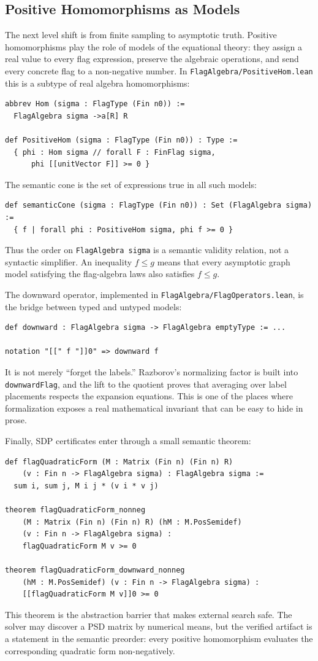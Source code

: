 \documentclass{article}
\newcommand{\lean}[1]{\texttt{#1}}
\begin{document}
\subsection{Positive Homomorphisms as Models}

The next level shift is from finite sampling to asymptotic truth.  Positive
homomorphisms play the role of models of the equational theory: they assign a
real value to every flag expression, preserve the algebraic operations, and
send every concrete flag to a non-negative number.  In
\lean{FlagAlgebra/PositiveHom.lean} this is a subtype of real algebra
homomorphisms:
\begin{lstlisting}
abbrev Hom (sigma : FlagType (Fin n0)) :=
  FlagAlgebra sigma ->a[R] R

def PositiveHom (sigma : FlagType (Fin n0)) : Type :=
  { phi : Hom sigma // forall F : FinFlag sigma,
      phi [[unitVector F]] >= 0 }
\end{lstlisting}
The semantic cone is the set of expressions true in all such models:
\begin{lstlisting}
def semanticCone (sigma : FlagType (Fin n0)) : Set (FlagAlgebra sigma) :=
  { f | forall phi : PositiveHom sigma, phi f >= 0 }
\end{lstlisting}
Thus the order on \lean{FlagAlgebra sigma} is a semantic validity relation, not
a syntactic simplifier.  An inequality $f\leq g$ means that every asymptotic
graph model satisfying the flag-algebra laws also satisfies $f\leq g$.

The downward operator, implemented in \lean{FlagAlgebra/FlagOperators.lean},
is the bridge between typed and untyped models:
\begin{lstlisting}
def downward : FlagAlgebra sigma -> FlagAlgebra emptyType := ...

notation "[[" f "]]0" => downward f
\end{lstlisting}
It is not merely ``forget the labels.''  Razborov's normalizing factor is built
into \lean{downwardFlag}, and the lift to the quotient proves that averaging
over label placements respects the expansion equations.  This is one of the
places where formalization exposes a real mathematical invariant that can be
easy to hide in prose.

Finally, SDP certificates enter through a small semantic theorem:
\begin{lstlisting}
def flagQuadraticForm (M : Matrix (Fin n) (Fin n) R)
    (v : Fin n -> FlagAlgebra sigma) : FlagAlgebra sigma :=
  sum i, sum j, M i j * (v i * v j)

theorem flagQuadraticForm_nonneg
    (M : Matrix (Fin n) (Fin n) R) (hM : M.PosSemidef)
    (v : Fin n -> FlagAlgebra sigma) :
    flagQuadraticForm M v >= 0

theorem flagQuadraticForm_downward_nonneg
    (hM : M.PosSemidef) (v : Fin n -> FlagAlgebra sigma) :
    [[flagQuadraticForm M v]]0 >= 0
\end{lstlisting}
This theorem is the abstraction barrier that makes external search safe.  The
solver may discover a PSD matrix by numerical means, but the verified artifact
is a statement in the semantic preorder: every positive homomorphism evaluates
the corresponding quadratic form non-negatively.
\end{document}
